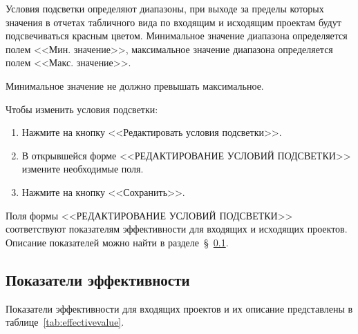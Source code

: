 Условия подсветки определяют диапазоны, при выходе за пределы которых значения
в отчетах табличного вида по входящим и исходящим проектам будут
подсвечиваться красным цветом.
Минимальное значение диапазона определяется полем <<Мин. значение>>,
максимальное значение диапазона определяется полем <<Макс. значение>>.

Минимальное значение не должно превышать максимальное.

Чтобы изменить условия подсветки:
\begin{enumerate}
    \item Нажмите на кнопку <<Редактировать условия подсветки>>.
    \item В открывшейся форме <<РЕДАКТИРОВАНИЕ УСЛОВИЙ ПОДСВЕТКИ>> измените необходимые поля.
    \item Нажмите на кнопку <<Сохранить>>.
\end{enumerate}

Поля формы <<РЕДАКТИРОВАНИЕ УСЛОВИЙ ПОДСВЕТКИ>> соответствуют показателям эффективности
для входящих и исходящих проектов. Описание показателей можно найти в разделе~\S~\ref{subsec:показатели-эффективности}.

\subsection{Показатели эффективности}\label{subsec:показатели-эффективности}

Показатели эффективности для входящих проектов и их описание представлены в таблице~\ref{tab:effectivevalue}.

